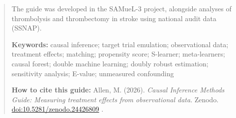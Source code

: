 \documentclass[11pt,a4paper]{article}
\begin{document}
\begin{abstract}
The guide was developed in the SAMueL-3 project, alongside analyses of thrombolysis and thrombectomy in stroke using national audit data (SSNAP).

\medskip
\noindent\textbf{Keywords:} causal inference; target trial emulation; observational data; treatment effects; matching; propensity score; S-learner; meta-learners; causal forest; double machine learning; doubly robust estimation; sensitivity analysis; E-value; unmeasured confounding

\medskip
\noindent\textbf{How to cite this guide:} Allen, M. (2026). \emph{Causal Inference Methods Guide: Measuring treatment effects from observational data}. Zenodo. \href{https://doi.org/10.5281/zenodo.24426809}{doi:10.5281/zenodo.24426809} \cite{allen2026guide}.
\end{abstract}
\newpage
\tableofcontents
\newpage













\end{document}
